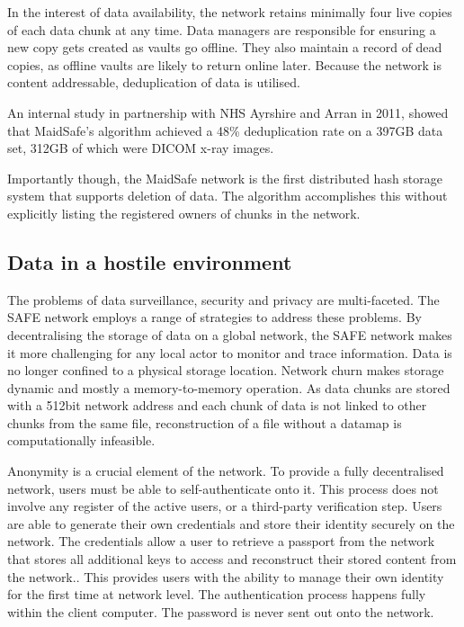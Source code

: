 \documentclass[twocolumn,english]{article}
\begin{document}
In the interest of data availability, the network retains minimally four live
copies of each data chunk at any time. Data managers are responsible for ensuring a new copy gets created as vaults go offline.  They also maintain a record of dead copies, as offline vaults are likely to return online later.  Because the network is content addressable, deduplication of data is utilised.

An internal study in partnership with NHS Ayrshire and Arran in 2011, showed that MaidSafe's algorithm achieved a 48\% deduplication rate on a 397GB data set, 312GB of which were DICOM x-ray images.

Importantly though, the MaidSafe network is the first distributed hash storage system that supports deletion of data.  The algorithm accomplishes this without explicitly listing the registered owners of chunks in the network. 




\subsection{Data in a hostile environment}

The problems of data surveillance, security and privacy are multi-faceted. The SAFE network employs a range of strategies to address these problems. By decentralising the storage of data on a global network, the SAFE
network makes it more challenging for any local actor to monitor and trace information.  Data is no longer confined to a physical storage location.  Network churn makes storage dynamic and mostly a memory-to-memory operation.
As data chunks are stored with a 512bit network address and each chunk of data
is not linked to other chunks from the same file, reconstruction of a file without a datamap is computationally infeasible. 

Anonymity is a crucial element of the network. To provide a fully decentralised network, users must be able to self-authenticate onto it.  This process does not involve any register of the active users, or a third-party verification step.  Users are able to generate their own credentials and store their identity securely on the network. The credentials allow a user to retrieve a passport from the network that stores all additional keys to access and reconstruct their stored content from the network.\cite{msSA}. This provides users with the ability to manage their own
identity for the first time at network level.  The authentication process happens fully within the client computer. The password is never sent out onto the network.
\end{document}

